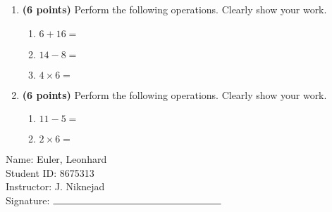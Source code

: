 \documentclass[12pt]{amsart}
\begin{document}
\newpage
\begin{enumerate}
\item {\bf (6 points)} 
 Perform the following operations. Clearly show your work. \begin{enumerate}


\def \a{6}\def \b{16}\def \apb{22}

 
\item $\a + \b = $

\vspace{2cm}
\def \a{14}\def \dif{6}\def \b{8}

 
\item $\a - \b = $

\vspace{2cm}
\def \a{4}\def \b{6}\def \ab{10}

 
\item $\a \times \b = $ 

\vspace{2cm}
\def \vshift{-1}\def \hshift{0}\def \chang{-1}\def \findval{-1}\def \yval{1}

 
\end{enumerate}


\newpage
\item {\bf (6 points)} 
 Perform the following operations. Clearly show your work. \begin{enumerate}


\def \a{11}\def \dif{6}\def \b{5}

 
\item $\a - \b = $

\vspace{2cm}
\def \a{2}\def \b{6}\def \ab{8}

 
\item $\a \times \b = $ 

\vspace{2cm}
\def \vshift{-1}\def \hshift{-4}\def \chang{0}\def \findval{-4}\def \yval{-1}

 
\end{enumerate}


\newpage\end{enumerate}\graphicspath{{C:/Users/iainc/anaconda3/Randomizer/Sample Course/Sample Assessment 2/}}\setcounter{page}{1}


\thispagestyle{fancy}

 \noindent Name: Euler, Leonhard \vspace{.3cm} \\\noindent Student ID: 8675313 \vspace{.3cm} \\\noindent Instructor: J. Niknejad \vspace{.3cm} \\\noindent Signature: $\rule{6cm}{0.15mm}$ \vspace{.3cm} \\ 
\end{document}
